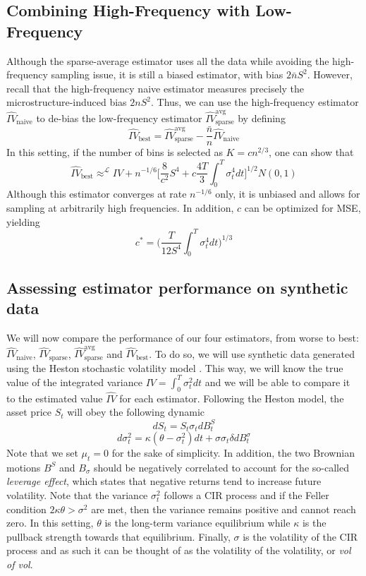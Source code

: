 \documentclass[a4paper,12pt,twoside]{article}
\begin{document}
\subsection{Combining High-Frequency with Low-Frequency}
Although the sparse-average estimator uses all the data while avoiding the high-frequency sampling issue, it is still a biased estimator, with bias $2\bar{n}S^2$. However, recall that the high-frequency naive estimator measures precisely the microstructure-induced bias $2nS^2$. Thus, we can use the high-frequency estimator $\hat{IV}_\text{naive}$ to de-bias the low-frequency estimator $\hat{IV}_\text{sparse}^\text{avg}$ by defining $$\hat{IV}_\text{best}=\hat{IV}_\text{sparse}^\text{avg}-\frac{\bar{n}}{n}\hat{IV}_\text{naive}$$
In this setting, if the number of bins is selected as $K=cn^{2/3}$, one can show that
$$\hat{IV}_\text{best} \approx^{\mathcal{L}} IV + n^{-1/6}\big[ \frac{8}{c^2}S^4 + c\frac{4T}{3}\int_0^T \sigma_t^4 dt \big]^{1/2}N(0,1)$$
Although this estimator converges at rate $n^{-1/6}$ only, it is unbiased and allows for sampling at arbitrarily high frequencies. In addition, $c$ can be optimized for MSE, yielding $$c^*=\big( \frac{T}{12S^4}\int_0^T \sigma_t^4 dt \big)^{1/3}$$

\subsection{Assessing estimator performance on synthetic data}
We will now compare the performance of our four estimators, from worse to best: $\hat{IV}_\text{naive}$, $\hat{IV}_\text{sparse}$, $\hat{IV}_\text{sparse}^\text{avg}$ and $\hat{IV}_\text{best}$.
To do so, we will use synthetic data generated using the Heston stochastic volatility model \cite{heston}. This way, we will know the true value of the integrated variance $IV=\int_0^T \sigma_t^2 dt$ and we will be able to compare it to the estimated value $\hat{IV}$ for each estimator.
Following the Heston model, the asset price $S_t$ will obey the following dynamic
$$dS_t = S_t\sigma_t dB_t^S$$
$$d\sigma_t^2 = \kappa(\theta-\sigma_t^2)dt + \sigma \sigma_t\delta dB_t^\sigma$$
Note that we set $\mu_t=0$ for the sake of simplicity. In addition, the two Brownian motions $B^S$ and $B_\sigma$ should be negatively correlated to account for the so-called \textit{leverage effect}, which states that negative returns tend to increase future volatility. Note that the variance $\sigma_t^2$ follows a CIR process and if the Feller condition $2\kappa \theta > \sigma^2$ are met, then the variance remains positive and cannot reach zero. In this setting, $\theta$ is the long-term variance equilibrium while $\kappa$ is the pullback strength towards that equilibrium. Finally, $\sigma$ is the volatility of the CIR process and as such it can be thought of as the volatility of the volatility, or \textit{vol of vol}.
\end{document}
